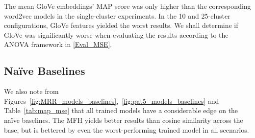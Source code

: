 The mean GloVe embeddings' \ac{MAP} score was only higher than the corresponding word2vec models in the single-cluster experiments.  In the 10 and 25-cluster configurations, GloVe features yielded the worst results.  We shall determine if GloVe was significantly worse when evaluating the results according to the \ac{ANOVA} framework in \cref{Eval_MSE}.

\subsection{Na\"ive Baselines}
We also note from Figures~\ref{fig:MRR_models_baselines},~\ref{fig:pat5_models_baselines} and Table~\ref{tab:map_mse} that all trained models have a considerable edge on the na\"ive baselines.  The \ac{MFH} yields better results than cosine similarity across the base, but is bettered by even the worst-performing trained model in all scenarios.  

